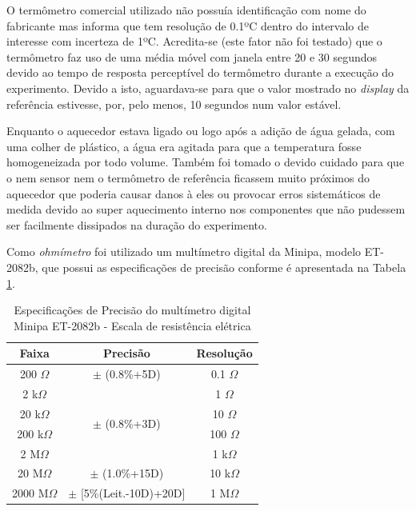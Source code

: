 \documentclass[a4paper]{instrumentacao}
\begin{document}
O termômetro comercial utilizado não possuía identificação com nome do fabricante mas informa que tem resolução de 0.1ºC dentro do intervalo de interesse com incerteza de 1ºC. Acredita-se (este fator não foi testado) que o termômetro faz uso de uma média móvel com janela entre 20 e 30 segundos devido ao tempo de resposta perceptível do termômetro durante a execução do experimento. Devido a isto, aguardava-se para que o valor mostrado no \textit{display} da referência estivesse, por, pelo menos, 10 segundos num valor estável.

Enquanto o aquecedor estava ligado ou logo após a adição de água gelada, com uma colher de plástico, a água era agitada para que a temperatura fosse homogeneizada por todo volume. Também foi tomado o devido cuidado para que o nem sensor nem o termômetro de referência ficassem muito próximos do aquecedor que poderia causar danos à eles ou provocar erros sistemáticos de medida devido ao super aquecimento interno nos componentes que não pudessem ser facilmente dissipados na duração do experimento.

Como \textit{ohmímetro} foi utilizado um multímetro digital da Minipa, modelo ET-2082b, que possui as especificações de precisão conforme é apresentada na Tabela \ref{tab:precisao-multimetro}. 

\begin{table}[H]
\centering
\caption{Especificações de Precisão do multímetro digital Minipa ET-2082b - Escala de resistência elétrica}
\label{tab:precisao-multimetro}
\begin{tabular}{|c|c|c|}
\hline
\textbf{Faixa} & \textbf{Precisão}                 & \textbf{Resolução} \\ \hline
200 $\Omega$           & $\pm$ (0.8\%+5D)                  & 0.1 $\Omega$                 \\ \hline
2 k$\Omega$             & \multirow{4}{*}{$\pm$ (0.8\%+3D)} & 1 $\Omega$                   \\ \cline{1-1} \cline{3-3} 
20 k$\Omega$            &                                   & 10 $\Omega$                  \\ \cline{1-1} \cline{3-3} 
200 k$\Omega$           &                                   & 100 $\Omega$                 \\ \cline{1-1} \cline{3-3} 
2 M$\Omega$             &                                   & 1 k$\Omega$                 \\ \hline
20 M$\Omega$            & $\pm$ (1.0\%+15D)                 & 10 k$\Omega$                \\ \hline
2000 M$\Omega$          & $\pm$ {[}5\%(Leit.-10D)+20D{]}    & 1 M$\Omega$                 \\ \hline
\end{tabular}
\end{table}
\end{document}
